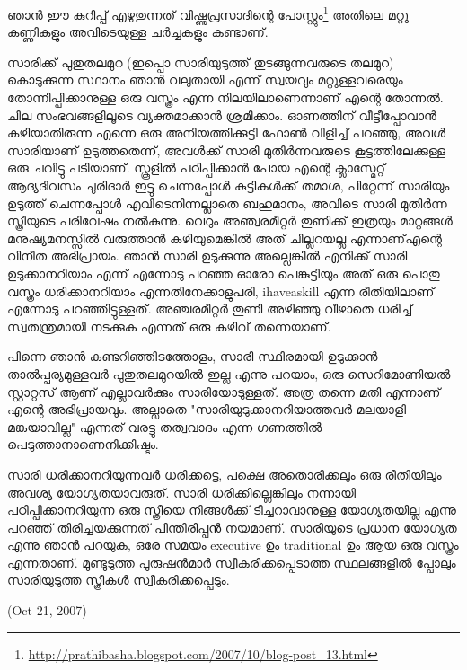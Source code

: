 \vskip 2pt


ഞാന്‍ ഈ കുറിപ്പ് എഴുതുന്നത് വിഷ്ണുപ്രസാദിന്റെ പോസ്റ്റും\footnote{\url{http://prathibasha.blogspot.com/2007/10/blog-post_13.html}} 
അതിലെ മറ്റു കണ്ണികളും അവിടെയുള്ള ചര്‍ച്ചകളും കണ്ടാണ്.

സാരിക്ക് പുതുതലമുറ (ഇപ്പൊ സാരിയുടുത്ത് തുടങ്ങുന്നവരുടെ തലമുറ) കൊടുക്കുന്ന സ്ഥാനം ഞാന്‍ വലുതായി 
എന്ന് സ്വയവും മറ്റുള്ളവരെയും തോന്നിപ്പിക്കാനുള്ള ഒരു വസ്ത്രം എന്ന നിലയിലാണെന്നാണ് എന്റെ തോന്നല്‍. 
ചില സംഭവങ്ങളിലൂടെ വ്യക്തമാക്കാന്‍ ശ്രമിക്കാം. ഓണത്തിന് വീട്ടീപ്പോവാന്‍ കഴിയാതിരുന്ന എന്നെ ഒരു 
അനിയത്തിക്കുട്ടി ഫോണ്‍ വിളിച്ച് പറഞ്ഞു, അവള്‍ സാരിയാണ് ഉടുത്തതെന്ന്, അവള്‍ക്ക് സാരി മുതിര്‍ന്നവരുടെ
കൂട്ടത്തിലേക്കുള്ള ഒരു ചവിട്ടു പടിയാണ്. സ്കൂളില്‍ പഠിപ്പിക്കാന്‍ പോയ എന്റെ ക്ലാസ്മേറ്റ് ആദ്യദിവസം ചുരിദാര്‍
ഇട്ടു ചെന്നപ്പോള്‍ കുട്ടികള്‍ക്ക് തമാശ, പിറ്റേന്ന് സാരിയും ഉടുത്ത് ചെന്നപ്പോള്‍ എവിടെനിന്നല്ലാതെ ബഹുമാനം, 
അവിടെ സാരി മുതിര്‍ന്ന സ്ത്രീയുടെ പരിവേഷം നല്‍കുന്നു. വെറും അഞ്വരമീറ്റര്‍ തുണിക്ക് ഇത്രയും മാറ്റങ്ങള്‍ 
മനുഷ്യമനസ്സില്‍ വരുത്താന്‍ കഴിയുമെങ്കില്‍ അത് ചില്ലറയല്ല എന്നാണ്എന്റെ വിനീത അഭിപ്രായം. ഞാന്‍ സാരി 
ഉടുക്കുന്നു അല്ലെങ്കില്‍ എനിക്ക് സാരി ഉടുക്കാനറിയാം എന്ന് എന്നോടു പറഞ്ഞ ഓരോ പെങ്കുട്ടിയും അത് ഒരു 
പൊതു വസ്ത്രം ധരിക്കാനറിയാം എന്നതിനേക്കാളുപരി, ihaveaskill എന്ന രീതിയിലാണ് എന്നോടു പറഞ്ഞിട്ടുള്ളത്. 
അഞ്ചരമീറ്റര്‍ തുണി അഴിഞ്ഞു വീഴാതെ ധരിച്ച് സ്വതന്ത്രമായി നടക്കുക എന്നത് ഒരു കഴിവ് തന്നെയാണ്.

പിന്നെ ഞാന്‍ കണ്ടറിഞ്ഞിടത്തോളം, സാരി സ്ഥിരമായി ഉടുക്കാന്‍ താല്‍പ്പര്യമുള്ളവര്‍ പുതുതലമുറയില്‍ ഇല്ല എന്നു പറയാം, 
ഒരു സെറിമോണിയല്‍ സ്റ്റാറ്റസ് ആണ് എല്ലാവര്‍ക്കും സാരിയോടുള്ളത്. അത്ര തന്നെ മതി എന്നാണ് എന്റെ അഭിപ്രായവും. 
അല്ലാതെ "സാരിയുടുക്കാനറിയാത്തവര്‍ മലയാളി മങ്കയാവില്ല" എന്നത് വരട്ടു തത്വവാദം എന്ന ഗണത്തില്‍ 
പെടുത്താനാണെനിക്കിഷ്ടം.

സാരി ധരിക്കാനറിയുന്നവര്‍ ധരിക്കട്ടെ, പക്ഷെ അതൊരിക്കലും ഒരു രീതിയിലും അവശ്യ യോഗ്യതയാവരുത്.
സാരി ധരിക്കില്ലെങ്കിലും നന്നായി പഠിപ്പിക്കാനറിയുന്ന ഒരു സ്ത്രീയെ നിങ്ങള്‍ക്ക് ടീച്ചറാവാനുള്ള യോഗ്യതയില്ല 
എന്നു പറഞ്ഞ് തിരിച്ചയക്കുന്നത് പിന്തിരിപ്പന്‍ നയമാണ്. സാരിയുടെ പ്രധാന യോഗ്യത എന്നു ഞാന്‍ പറയുക,
ഒരേ സമയം executive ഉം traditional ഉം ആയ ഒരു വസ്ത്രം എന്നതാണ്. മുണ്ടുടുത്ത പുരുഷന്‍മാര്‍ സ്വീകരിക്കപ്പെടാത്ത
സ്ഥലങ്ങളില്‍ പ്പോലും സാരിയുടുത്ത സ്ത്രീകള്‍ സ്വീകരിക്കപ്പെടും.

(Oct 21, 2007)
\newpage

